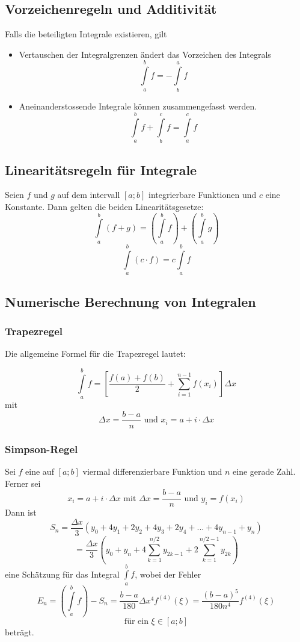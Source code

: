 \documentclass[10pt,a4paper]{scrartcl}
\begin{document}
\subsection{Vorzeichenregeln und Additivität}

Falls die beteiligten Integrale existieren, gilt
\begin{itemize}
\item Vertauschen der Integralgrenzen ändert das Vorzeichen des Integrals
$$\int\limits_a^b f = - \int\limits_b^a f$$
\item Aneinanderstossende Integrale können zusammengefasst werden.
$$\int\limits_a^b f + \int\limits_b^c f = \int\limits_a^c f$$
\end{itemize}


\subsection{Linearitätsregeln für Integrale}

Seien $f$ und $g$ auf dem intervall $[a;b]$ integrierbare Funktionen und $c$ eine
Konstante. Dann gelten die beiden Linearitätsgesetze:
$$\int\limits_a^b (f + g) = \left(\int\limits_a^b f\right) + 
    \left(\int\limits_a^b g\right)$$
$$\int\limits_a^b (c \cdot f) = c \int\limits_a^b f$$


\subsection{Numerische Berechnung von Integralen}

\subsubsection{Trapezregel}

Die allgemeine Formel für die Trapezregel lautet:

$$\int\limits_a^b f = \left[\frac{f(a) + f(b)}{2} + \sum_{i=1}^{n-1} f(x_i)\right] \Delta x$$
mit
$$\Delta x = \frac{b-a}{n} \textrm{ und } x_i = a + i \cdot \Delta x$$

\subsubsection{Simpson-Regel}

Sei $f$ eine auf $[a;b]$ viermal differenzierbare Funktion und $n$ eine gerade Zahl.
Ferner sei
$$x_i = a + i \cdot \Delta x \textrm{ mit } \Delta x = \frac{b-a}{n}
    \textrm{ und } y_i = f(x_i)$$
Dann ist
$$S_n = \frac{\Delta x}{3}(y_0 + 4y_1 + 2y_2 + 4y_3 + 2y_4 + ... + 4y_{n-1} + y_n)$$
$$= \frac{\Delta x}{3}\left(y_0 + y_n + 4 \sum_{k=1}^{n/2} y_{2k-1} 
    + 2 \sum_{k=1}^{n/2-1} y_{2k}\right)$$
eine Schätzung für das Integral $\int\limits_a^b f$, wobei der Fehler
$$E_n = \left(\int\limits_a^b f\right) - S_n = \frac{b-a}{180}\Delta x^4 f^{(4)}(\xi)
    = \frac{(b-a)^5}{180n^4} f^{(4)}(\xi)$$
$$\textrm{für ein } \xi \in [a;b]$$
beträgt.
\end{document}

